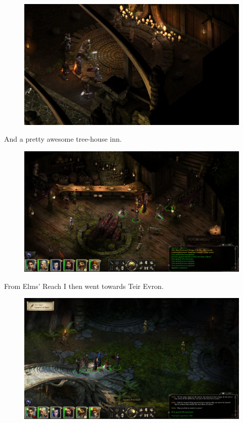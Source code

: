 \documentclass{article}
\begin{document}
\begin{figure}
\includegraphics[scale=0.33]{files/blog/2019_03_04_pillars_of_eternity_path_of_the_damned_act_iii/2019_03_04_hearthsong2.jpg}
\end{figure}

And a pretty awesome tree-house inn.

\begin{figure}
\includegraphics[scale=0.33]{files/blog/2019_03_04_pillars_of_eternity_path_of_the_damned_act_iii/2019_03_04_hearthsong3.jpg}
\end{figure}

From Elms' Reach I then went towards Teir Evron.

\begin{figure}
\includegraphics[scale=0.33]{files/blog/2019_03_04_pillars_of_eternity_path_of_the_damned_act_iii/2019_03_04_elmsreach1.jpg}
\end{figure}
\end{document}
